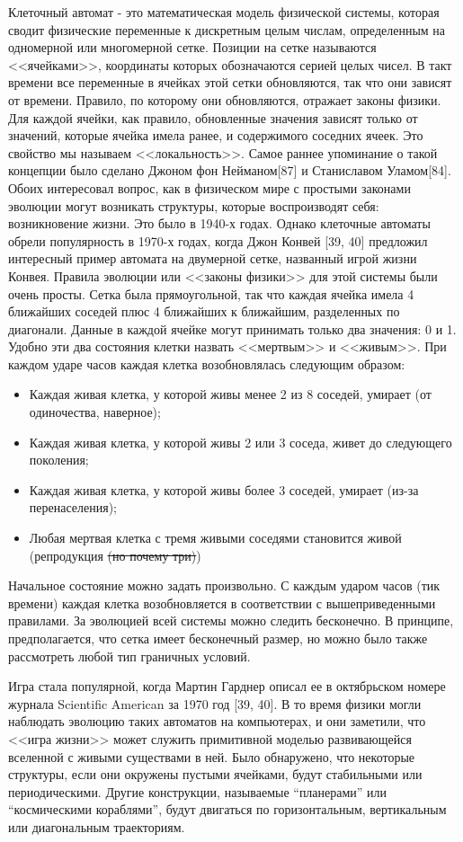 \documentclass[main.tex]{subfiles}
\begin{document}
Клеточный автомат - это математическая модель физической системы, которая сводит физические переменные к дискретным целым числам, определенным на одномерной или многомерной сетке. Позиции на сетке называются <<ячейками>>, координаты которых обозначаются серией целых чисел. В такт времени все переменные в ячейках этой сетки обновляются, так что они зависят от времени. Правило, по которому они обновляются, отражает законы физики. Для каждой ячейки, как правило, обновленные значения зависят только от значений, которые ячейка имела ранее, и содержимого соседних ячеек. Это свойство мы называем <<локальность>>. Самое раннее упоминание о такой концепции было сделано Джоном фон Нейманом[87] и Станиславом Уламом[84]. 
Обоих интересовал вопрос, как в физическом мире с простыми законами эволюции могут возникать структуры, которые воспроизводят себя: возникновение жизни. Это было в 1940-х годах. Однако клеточные автоматы обрели популярность в 1970-х годах, когда Джон Конвей [39, 40] предложил интересный пример автомата на двумерной сетке, названный игрой жизни Конвея. Правила эволюции или <<законы физики>> для этой системы были очень просты. Сетка была прямоугольной, так что каждая ячейка имела 4 ближайших соседей плюс 4 ближайших к ближайшим, разделенных по диагонали. Данные в каждой ячейке могут принимать только два значения: 0 и 1. Удобно эти два состояния клетки назвать <<мертвым>> и <<живым>>. При каждом ударе часов каждая клетка возобновлялась следующим образом:

\begin{itemize}
\item Каждая живая клетка, у которой живы менее 2 из 8 соседей, умирает (от одиночества, наверное);
\item Каждая живая клетка, у которой живы 2 или 3 соседа, живет до следующего поколения;
\item Каждая живая клетка, у которой живы более 3 соседей, умирает (из-за перенаселения);
\item Любая мертвая клетка с тремя живыми соседями становится живой (репродукция \sout{(но почему три)})
\end{itemize} 

Начальное состояние можно задать произвольно. С каждым ударом часов (тик времени) каждая клетка возобновляется в соответствии с вышеприведенными правилами. За эволюцией всей системы можно следить бесконечно. В принципе, предполагается, что сетка имеет бесконечный размер, но можно было также рассмотреть любой тип граничных условий. 

Игра стала популярной, когда Мартин Гарднер описал ее в октябрьском номере журнала Scientific American за 1970 год [39, 40]. В то время физики могли наблюдать эволюцию таких автоматов на компьютерах, и они заметили, что <<игра жизни>> может служить примитивной моделью развивающейся вселенной с живыми существами в ней. Было обнаружено, что некоторые структуры, если они окружены пустыми ячейками, будут стабильными или периодическими. Другие конструкции, называемые ``планерами'' или ``космическими кораблями'', будут двигаться по горизонтальным, вертикальным или диагональным траекториям. 
\end{document}
